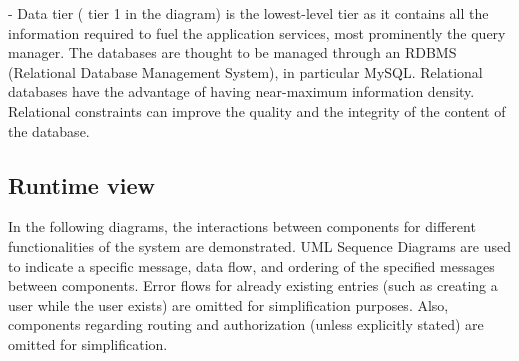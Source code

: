 - Data tier ( tier 1 in the diagram) is the lowest-level tier as it contains all the information required to fuel the
application services, most prominently the query manager. The
databases are thought to be managed through an RDBMS
(Relational Database Management System), in particular MySQL. Relational databases
have the advantage of having near-maximum information density.
Relational constraints can improve the quality and
the integrity of the content of the database.

\subsection{Runtime view}

In the following diagrams, the interactions between components for different functionalities of the system are demonstrated.
UML Sequence Diagrams are used to indicate a specific message, data flow, and ordering of the specified messages between components.
Error flows for already existing entries (such as creating a user while the user exists) are omitted for simplification purposes.
Also, components regarding routing and authorization (unless explicitly stated) are omitted for simplification.

